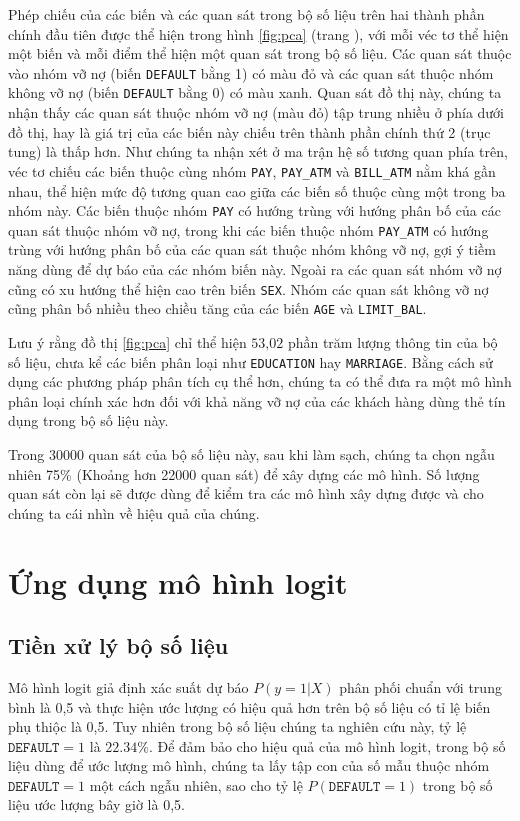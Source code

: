 \documentclass[a4paper]{report}\usepackage[]{graphicx}\usepackage[]{color}
\begin{document}
Phép chiếu của các biến và các quan sát trong bộ số liệu trên hai thành phần chính đầu tiên được thể hiện trong hình \ref{fig:pca} (trang \pageref{fig:pca}), với mỗi véc tơ thể hiện một biến và mỗi điểm thể hiện một quan sát trong bộ số liệu. Các quan sát thuộc vào nhóm vỡ nợ (biến \texttt{DEFAULT} bằng 1) có màu đỏ và các quan sát thuộc nhóm không vỡ nợ (biến \texttt{DEFAULT} bằng 0) có màu xanh. 
Quan sát đồ thị này, chúng ta nhận thấy các quan sát thuộc nhóm vỡ nợ (màu đỏ) tập trung nhiều ở phía dưới đồ thị, hay là giá trị của các biến này chiếu trên thành phần chính thứ 2 (trục tung) là thấp hơn. 
Như chúng ta nhận xét ở ma trận hệ số tương quan phía trên, véc tơ chiếu các biến thuộc cùng nhóm \texttt{PAY}, \texttt{PAY\_ATM} và \texttt{BILL\_ATM} nằm khá gần nhau, thể hiện mức độ tương quan cao giữa các biến số thuộc cùng một trong ba nhóm này. Các biến thuộc nhóm \texttt{PAY} có hướng trùng với hướng phân bố của các quan sát thuộc nhóm vỡ nợ, trong khi các biến thuộc nhóm \texttt{PAY\_ATM} có hướng trùng với hướng phân bố của các quan sát thuộc nhóm không vỡ nợ, gợi ý tiềm năng dùng để dự báo của các nhóm biến này. 
Ngoài ra các quan sát nhóm vỡ nợ cũng có xu hướng thể hiện cao trên biến 
\texttt{SEX}. Nhóm các quan sát không vỡ nợ cũng phân bố nhiều theo chiều tăng của các biến \texttt{AGE} và \texttt{LIMIT\_BAL}.

Lưu ý rằng đồ thị \ref{fig:pca} chỉ thể hiện $\text{53,02}$ phần trăm lượng thông tin của bộ số liệu, chưa kể các biến phân loại như \texttt{EDUCATION} hay \texttt{MARRIAGE}. Bằng cách sử dụng các phương pháp phân tích cụ thể hơn, chúng ta có thể đưa ra một mô hình phân loại chính xác hơn đối với khả năng vỡ nợ của các khách hàng dùng thẻ tín dụng trong bộ số liệu này.

Trong 30000 quan sát của bộ số liệu này, sau khi làm sạch, chúng ta chọn ngẫu nhiên 75\% (Khoảng hơn 22000 quan sát) để xây dựng các mô hình. Số lượng quan sát còn lại sẽ được dùng để kiểm tra các mô hình xây dựng được và cho chúng ta cái nhìn về hiệu quả của chúng.


\section{Ứng dụng mô hình logit}

\subsection{Tiền xử lý bộ số liệu}
Mô hình logit giả định xác suất dự báo  $P(y = 1|X)$  phân phối chuẩn với trung bình là 0,5 và thực hiện ước lượng có hiệu quả hơn trên bộ số liệu có tỉ lệ biến phụ thiộc là 0,5. 
Tuy nhiên trong bộ số liệu chúng ta nghiên cứu này, tỷ lệ  $\texttt{DEFAULT} = 1$ là $22.34\%$.
Để đảm bảo cho hiệu quả của mô hình logit, trong bộ số liệu dùng để ước lượng mô hình, chúng ta lấy tập con của số mẫu thuộc nhóm $\texttt{DEFAULT} = 1$ một cách ngẫu nhiên, sao cho tỷ lệ  $P(\texttt{DEFAULT} = 1)$ trong bộ số liệu ước lượng bây giờ là 0,5. 
\end{document}
